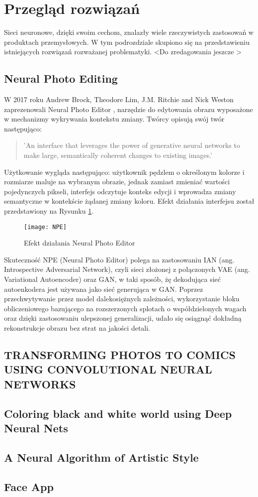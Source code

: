 \section{Przegląd rozwiązań}
  Sieci neuronowe, dzięki swoim cechom, znalazły wiele rzeczywistych zastosowań w produktach
  przemysłowych. W tym podrozdziale skupiono się na przedstawieniu istniejących
  rozwiązań rozważanej problematyki. \textless Do zredagowania jeszcze \textgreater

  \subsection{Neural Photo Editing}
    W 2017 roku Andrew Brock, Theodore Lim, J.M. Ritchie and Nick Weston
    zaprezenowali Neural Photo Editor \cite{neural_photo_editor}, narzędzie
    do edytowania obrazu wyposażone w mechanizmy wykrywania kontekstu zmiany.
    Twórcy opisują swój twór następująco:

    \begin{quote}
      'An interface that leverages the power of generative neural networks to
      make large, semantically coherent changes to existing images.'
    \end{quote}

    Użytkowanie wygląda następująco: użytkownik pędzlem o określonym kolorze i
    rozmiarze maluje na wybranym obrazie, jednak zamiast zmieniać wartości
    pojedynczych pikseli, interfejs odczytuje konteks edycji i wprowadza zmiany
    semantyczne w kontekście żądanej zmiany koloru. Efekt działania interfejsu
    został przedstawiony na Rysunku \ref{fig:npe}.

    \begin{figure}[h]
      \centering
      \texttt{[image: NPE]}
      \caption{Efekt działania Neural Photo Editor}
      \label{fig:npe}
    \end{figure}

    Skuteczność NPE (Neural Photo Editor) polega na zastosowaniu IAN
    (ang. Introspective Adversarial Network), czyli sieci złożonej z połączonych
    VAE (ang. Variational Autoencoder) oraz GAN, w taki sposób, żę dekodująca
    sieć autoenkodera jest używana jako sieć generująca w GAN.
    Poprzez przechwytywanie przez model dalekosiężnych zależności, wykorzystanie
    bloku obliczeniowego bazującego na rozszerzonych splotach o
    współdzielonych wagach oraz dzięki zastosowaniu ulepszonej generalizacji,
    udało się osiągnąć dokładną rekonstrukcje obrazu bez strat na jakości detali.


  \subsection{TRANSFORMING PHOTOS TO COMICS USING CONVOLUTIONAL NEURAL NETWORKS}

  \subsection{Coloring black and white world using Deep Neural Nets}

  \subsection{A Neural Algorithm of Artistic Style}

  \subsection{Face App}
